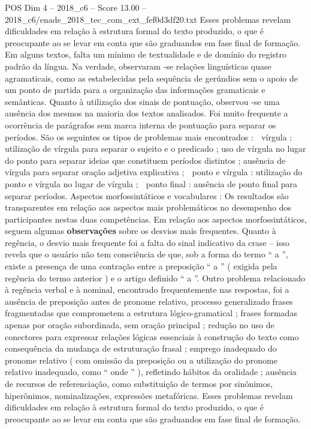 \begin{textsample}{POS Dim 4 – 2018\_c6 – Score 13.00 – 2018\_c6/enade\_2018\_tec\_com\_ext\_fef0d3df20.txt}
Esses problemas revelam dificuldades em relação à estrutura formal do texto produzido, o que é preocupante ao se levar em conta que são graduandos em fase final de formação.
Em alguns textos, falta um mínimo de textualidade e de domínio do registro padrão da língua.
Na verdade, observaram -se relações linguísticas quase agramaticais, como as estabelecidas pela sequência de gerúndios sem o apoio de um ponto de partida para a organização das informações gramaticais e semânticas.
Quanto à utilização dos sinais de pontuação, observou -se uma ausência dos mesmos na maioria dos textos analisados.
Foi muito frequente a ocorrência de parágrafos sem marca interna de pontuação para separar os períodos.
São os seguintes os tipos de problemas mais encontrados :  vírgula : utilização de vírgula para separar o sujeito e o predicado ; uso de vírgula no lugar do ponto para separar ideias que constituem períodos distintos ; ausência de vírgula para separar oração adjetiva explicativa ;  ponto e vírgula : utilização do ponto e vírgula no lugar de vírgula ;  ponto final : ausência de ponto final para separar períodos.
Aspectos morfossintáticos e vocabulares : Os resultados são transparentes em relação aos aspectos mais problemáticos no desempenho dos participantes nestas duas competências.
Em relação aos aspectos morfossintáticos, seguem algumas \textbf{observações} sobre os desvios mais frequentes.
Quanto à regência, o desvio mais frequente foi a falta do sinal indicativo da crase – isso revela que o usuário não tem consciência de que, sob a forma do termo “ a ”, existe a presença de uma contração entre a preposição “ a ” ( exigida pela regência do termo anterior ) e o artigo definido “ a ”.
Outro problema relacionado à regência verbal e à nominal, encontrado frequentemente nas respostas, foi a ausência de preposição antes de pronome relativo, processo generalizado frases fragmentadas que comprometem a estrutura lógico-gramatical ; frases formadas apenas por oração subordinada, sem oração principal ; redução no uso de conectores para expressar relações lógicas essenciais à construção do texto como consequência da mudança de estruturação frasal ; emprego inadequado do pronome relativo ( com omissão da preposição ou a utilização do pronome relativo inadequado, como “ onde ” ), refletindo hábitos da oralidade ; ausência de recursos de referenciação, como substituição de termos por sinônimos, hiperônimos, nominalizações, expressões metafóricas.
Esses problemas revelam dificuldades em relação à estrutura formal do texto produzido, o que é preocupante ao se levar em conta que são graduandos em fase final de formação.

\end{textsample}
